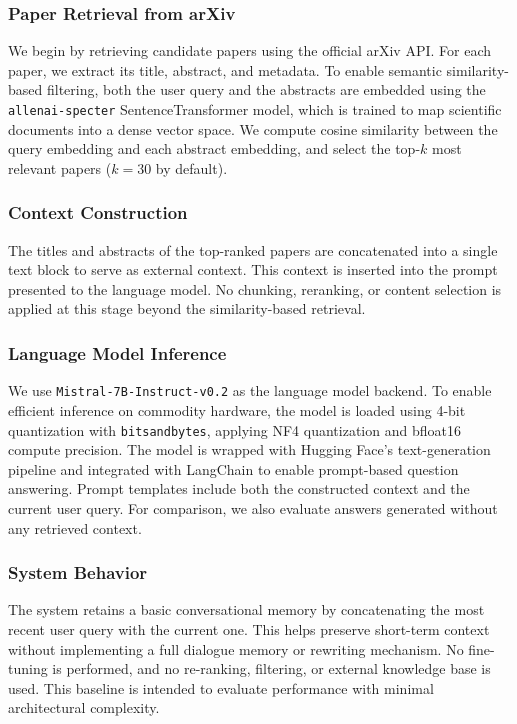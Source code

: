 \documentclass[fleqn,moreauthors,10pt]{ds_report}
\begin{document}
\subsubsection*{Paper Retrieval from arXiv}
We begin by retrieving candidate papers using the official arXiv API. For each paper, we extract its title, abstract, and metadata. To enable semantic similarity-based filtering, both the user query and the abstracts are embedded using the \texttt{allenai-specter} SentenceTransformer model, which is trained to map scientific documents into a dense vector space. We compute cosine similarity between the query embedding and each abstract embedding, and select the top-$k$ most relevant papers ($k=30$ by default).

\subsubsection*{Context Construction}
The titles and abstracts of the top-ranked papers are concatenated into a single text block to serve as external context. This context is inserted into the prompt presented to the language model. No chunking, reranking, or content selection is applied at this stage beyond the similarity-based retrieval.

\subsubsection*{Language Model Inference}
We use \texttt{Mistral-7B-Instruct-v0.2} as the language model backend. To enable efficient inference on commodity hardware, the model is loaded using 4-bit quantization with \texttt{bitsandbytes}, applying NF4 quantization and bfloat16 compute precision. The model is wrapped with Hugging Face's text-generation pipeline and integrated with LangChain to enable prompt-based question answering. Prompt templates include both the constructed context and the current user query. For comparison, we also evaluate answers generated without any retrieved context.

\subsubsection*{System Behavior}
The system retains a basic conversational memory by concatenating the most recent user query with the current one. This helps preserve short-term context without implementing a full dialogue memory or rewriting mechanism. No fine-tuning is performed, and no re-ranking, filtering, or external knowledge base is used. This baseline is intended to evaluate performance with minimal architectural complexity.
\end{document}
